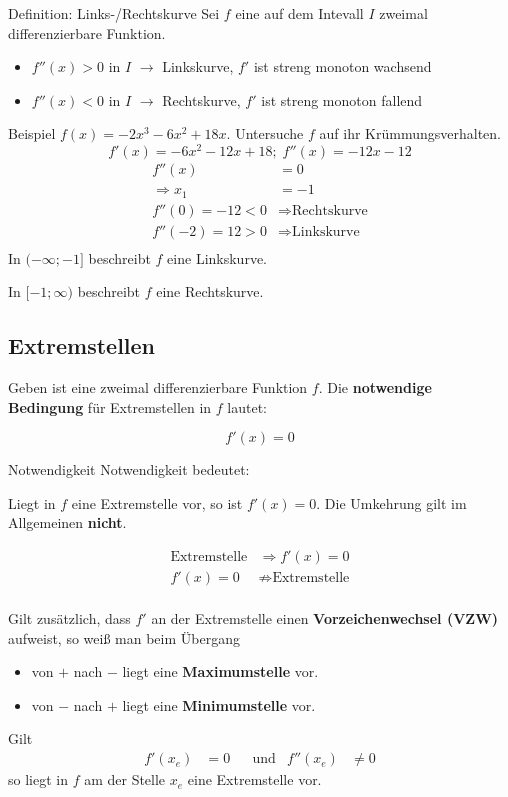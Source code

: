 \documentclass{article}
\begin{document}
\begin{boxx}[Red]{Definition: Links-/Rechtskurve}
    Sei $f$ eine auf dem Intevall $I$ zweimal differenzierbare Funktion.

    \begin{itemize}
        \item $f''(x)>0$ in $I$ $\rightarrow$ Linkskurve, $f'$ ist streng monoton wachsend
        \item $f''(x)<0$ in $I$ $\rightarrow$ Rechtskurve, $f'$ ist streng monoton fallend
    \end{itemize}
\end{boxx}
\newpage
\begin{boxx}[DarkBlue]{Beispiel}
    $\displaystyle f(x) = -2x^3 - 6x^2 + 18x$. 
    Untersuche $f$ auf ihr Krümmungsverhalten.
        \[f'(x) = -6x^2-12x+18;\; f''(x) = -12x-12\]
    \begin{align*}
        f''(x) &= 0 \\
        \Rightarrow x_1 &= -1\\
        f''(0) = -12 < 0 &\Rightarrow \text{Rechtskurve} \\
        f''(-2) = 12 > 0 &\Rightarrow \text{Linkskurve} \\
    \end{align*}
    In $\displaystyle (-\infty; -1]$ beschreibt $f$ eine Linkskurve.

    In $\displaystyle [-1; \infty)$ beschreibt $f$ eine Rechtskurve.
\end{boxx}

\subsection{Extremstellen}
Geben ist eine zweimal differenzierbare Funktion $f$. 
Die \textbf{notwendige Bedingung} für Extremstellen in $f$ lautet:

\[f'(x)=0\]

\begin{boxx}[LightYellow]{Notwendigkeit}
    Notwendigkeit bedeutet:

    Liegt in $f$ eine Extremstelle vor, so ist $f'(x) = 0$.
    Die Umkehrung gilt im Allgemeinen \textbf{nicht}.

    \begin{align*}
        \text{Extremstelle} &\Rightarrow f'(x) = 0 \\
        f'(x) = 0 &\not\Rightarrow \text{Extremstelle} \\
    \end{align*}
\end{boxx}
Gilt zusätzlich, dass $f'$ an der Extremstelle einen \textbf{Vorzeichenwechsel (VZW)} aufweist,
so weiß man beim Übergang
\begin{itemize}
    \item von $+$ nach $-$ liegt eine \textbf{Maximumstelle} vor.
    \item von $-$ nach $+$ liegt eine \textbf{Minimumstelle} vor.
\end{itemize}
Gilt
\begin{align*}
    &&&& f'\left(x_e\right) &= 0 &&\text{und} & f''\left(x_e\right) &\not = 0 &&&&
\end{align*}
so liegt in $f$ am der Stelle $x_e$ eine Extremstelle vor.
\end{document}

